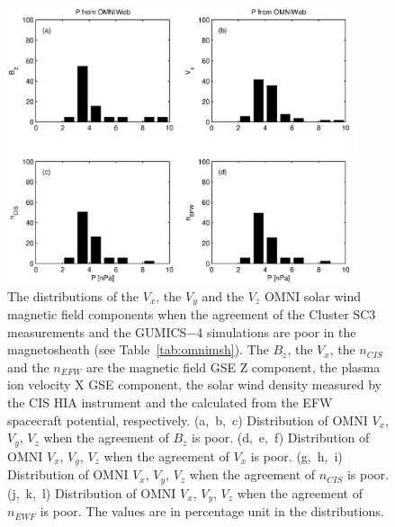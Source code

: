 \documentclass[linenumbers,draft]{agujournal}
\begin{document}
\begin{figure}[h]
\centering
\includegraphics[width=0.9\textwidth,angle=0]{swe-2020-corr-f19.eps}
\caption{The distributions of the $V_{x}$, the $V_{y}$  and the $V_{z}$ OMNI solar wind magnetic field components when the agreement of the Cluster SC3 measurements and the GUMICS$-$4 simulations are poor in the magnetosheath (see Table~\ref{tab:omnimsh}). The $B_{z}$, the $V_{x}$, the $n_{CIS}$ and the $n_{EFW}$ are the magnetic field GSE Z component, the plasma ion velocity X GSE component, the  solar wind density measured by the CIS HIA instrument and the calculated from the EFW spacecraft potential, respectively. (a,~b,~c) Distribution of OMNI $V_{x}$, $V_{y}$, $V_{z}$ when the agreement of $B_{z}$ is poor. (d,~e,~f) Distribution of OMNI  $V_{x}$, $V_{y}$, $V_{z}$ when the agreement of $V_{x}$ is poor. (g,~h,~i) Distribution of OMNI $V_{x}$, $V_{y}$, $V_{z}$ when the agreement of $n_{CIS}$ is poor. (j,~k,~l) Distribution of OMNI $V_{x}$, $V_{y}$, $V_{z}$ when the agreement of $n_{EWF}$ is poor. The values are in percentage unit in the distributions.}
\label{fig:mshomnivxyz}
\end{figure}

\pagebreak
\end{document}
